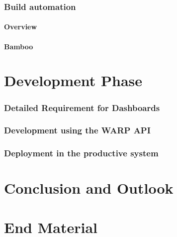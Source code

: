 \documentclass[a4paper, 12pt,oneside]{article}
\begin{document}
\section{Build automation}
\subsection{Overview}
\subsection{Bamboo}

\part{Development Phase}
\section{Detailed Requirement for Dashboards}
\section{Development using the WARP API}
\section{Deployment in the productive system}

\pagebreak
\part{Conclusion and Outlook}

\pagebreak
\part{End Material}


%
%
%
%


%
%
%
%



\pagebreak
{}%
\listoffigures
\end{document}
